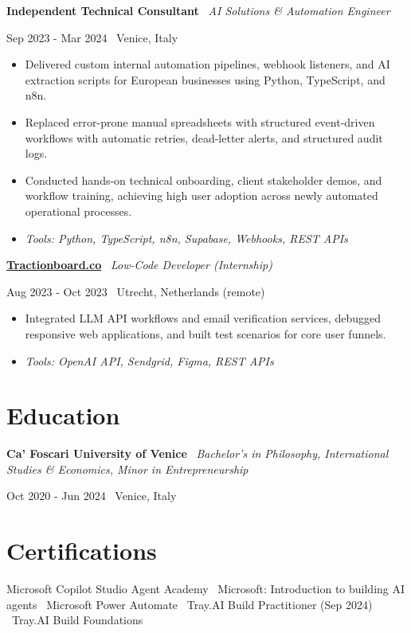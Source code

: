 \documentclass[a4paper,10pt]{article}
\newcommand{\role}[4]{%
 \vspace{2pt}\noindent
 \begin{minipage}[t]{0.70\textwidth}\raggedright\textbf{#1} \textbullet\ \textit{#3}\end{minipage}%
 \hfill
 \begin{minipage}[t]{0.28\textwidth}\raggedleft\footnotesize\color{gray}#2 \textbullet\ #4\end{minipage}%
 \vspace{1pt}%
}
\begin{document}
\role{Independent Technical Consultant}{Sep 2023 - Mar 2024}{AI Solutions \& Automation Engineer}{Venice, Italy}
\begin{itemize}
 \item Delivered custom internal automation pipelines, webhook listeners, and AI extraction scripts for European businesses using Python, TypeScript, and n8n.
 \item Replaced error-prone manual spreadsheets with structured event-driven workflows with automatic retries, dead-letter alerts, and structured audit logs.
 \item Conducted hands-on technical onboarding, client stakeholder demos, and workflow training, achieving high user adoption across newly automated operational processes.
 \item \textit{Tools: Python, TypeScript, n8n, Supabase, Webhooks, REST APIs}
\end{itemize}

\role{\href{https://tractionboard.co}{Tractionboard.co}}{Aug 2023 - Oct 2023}{Low-Code Developer (Internship)}{Utrecht, Netherlands (remote)}
\begin{itemize}
 \item Integrated LLM API workflows and email verification services, debugged responsive web applications, and built test scenarios for core user funnels.
 \item \textit{Tools: OpenAI API, Sendgrid, Figma, REST APIs}
\end{itemize}

\section{Education}
\role{Ca' Foscari University of Venice}{Oct 2020 - Jun 2024}{Bachelor's in Philosophy, International Studies \& Economics, Minor in Entrepreneurship}{Venice, Italy}

\section{Certifications}
Microsoft Copilot Studio Agent Academy \textbullet\ Microsoft: Introduction to building AI agents \textbullet\ Microsoft Power Automate \textbullet\ Tray.AI Build Practitioner (Sep 2024) \textbullet\ Tray.AI Build Foundations

\end{document}

